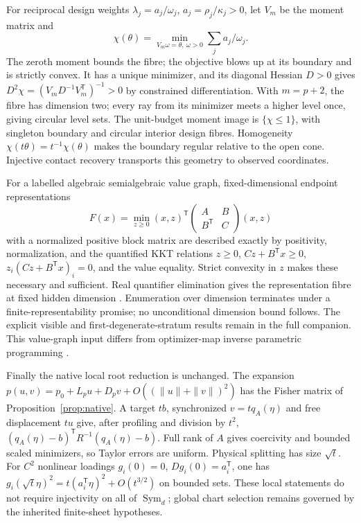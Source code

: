 \documentclass[11pt,reqno]{amsart}
\numberwithin{equation}{section}
\theoremstyle{definition}\newtheorem{definition}[theorem]{Definition}
\theoremstyle{remark}\newtheorem{remark}[theorem]{Remark}
\newcommand{\Sym}{\operatorname{Sym}}
\begin{document}
For reciprocal design weights $\lambda_j=a_j/\omega_j$, $a_j=\rho_j/\kappa_j>0$, let $V_m$ be the moment matrix and
\[
 \chi(\theta)=\min_{V_m\omega=\theta,\ \omega>0}\sum_j a_j/\omega_j.
\]
The zeroth moment bounds the fibre; the objective blows up at its boundary and is strictly convex. It has a unique minimizer, and its diagonal Hessian $D>0$ gives
$D^2\chi=(V_mD^{-1}V_m^{\mathsf T})^{-1}>0$ by constrained differentiation. With $m=p+2$, the fibre has dimension two; every ray from its minimizer meets a higher level once, giving circular level sets. The unit-budget moment image is $\{\chi\le1\}$, with singleton boundary and circular interior design fibres. Homogeneity $\chi(t\theta)=t^{-1}\chi(\theta)$ makes the boundary regular relative to the open cone. Injective contact recovery transports this geometry to observed coordinates.

For a labelled algebraic semialgebraic value graph, fixed-dimensional endpoint representations
\[
 F(x)=\min_{z\ge0}(x,z)^{\mathsf T}
               \begin{pmatrix}A&B\\B^{\mathsf T}&C\end{pmatrix}(x,z)
\]
with a normalized positive block matrix are described exactly by positivity, normalization, and the quantified KKT relations
$z\ge0$, $Cz+B^{\mathsf T}x\ge0$, $z_i(Cz+B^{\mathsf T}x)_i=0$, and the value equality. Strict convexity in $z$ makes these necessary and sufficient. Real quantifier elimination gives the representation fibre at fixed hidden dimension \cite{BPR}. Enumeration over dimension terminates under a finite-representability promise; no unconditional dimension bound follows. The explicit visible and first-degenerate-stratum results remain in the full companion. This value-graph input differs from optimizer-map inverse parametric programming \cite{HGL,NORHN}.

Finally the native local root reduction is unchanged. The expansion
$p(u,v)=p_0+L_pu+D_pv+O((\|u\|+\|v\|)^2)$ has the Fisher matrix of Proposition~\ref{prop:native}. A target $tb$, synchronized $v=tq_A(\eta)$ and free displacement $tu$ give, after profiling and division by $t^2$, $(q_A(\eta)-b)^{\mathsf T}R^{-1}(q_A(\eta)-b)$. Full rank of $A$ gives coercivity and bounded scaled minimizers, so Taylor errors are uniform. Physical splitting has size $\sqrt t$. For $C^2$ nonlinear loadings $g_i(0)=0$, $Dg_i(0)=a_i^{\mathsf T}$, one has $g_i(\sqrt t\eta)^2=t(a_i^{\mathsf T}\eta)^2+O(t^{3/2})$ on bounded sets. These local statements do not require injectivity on all of $\Sym_d$; global chart selection remains governed by the inherited finite-sheet hypotheses.
\end{document}
